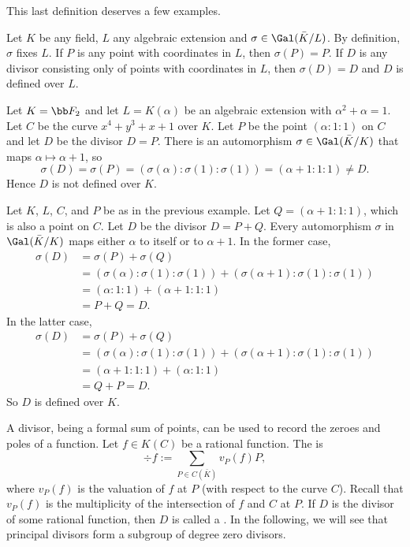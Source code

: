 This last definition deserves a few examples.
\begin{example}
  Let $K$ be any field, $L$ any algebraic extension and $\sigma \in \Gal(\bar K/L)$.
  By definition, $\sigma$ fixes $L$.
  If $P$ is any point with coordinates in $L$, then $\sigma(P) = P$.
  If $D$ is any divisor consisting only of points with coordinates in $L$, then $\sigma(D) = D$ and $D$ is defined over $L$.
\end{example}
\begin{example}
  Let $K = \bb F_2$ and let $L = K(\alpha)$ be an algebraic extension with $\alpha^2 + \alpha = 1$.
  Let $C$ be the curve $x^4 + y^3 + x + 1$ over $K$.
  Let $P$ be the point $(\alpha : 1 : 1)$ on $C$ and let $D$ be the divisor $D = P$.
  There is an automorphism $\sigma \in \Gal(\bar K/K)$ that maps $\alpha \mapsto \alpha + 1$, so 
    \[ \sigma(D) = \sigma(P) = (\sigma(\alpha) : \sigma(1) : \sigma(1)) = (\alpha + 1 : 1 : 1) \neq D. \]
  Hence $D$ is not defined over $K$.
\end{example}
\begin{example}
  Let $K$, $L$, $C$, and $P$ be as in the previous example.
  Let $Q = (\alpha + 1 : 1 : 1)$, which is also a point on $C$.
  Let $D$ be the divisor $D = P + Q$.
  Every automorphism $\sigma$ in $\Gal(\bar K/K)$ maps either $\alpha$ to itself or to $\alpha + 1$.
  In the former case,
  \begin{align*}
    \sigma(D) &= \sigma(P) + \sigma(Q) \\
              &= (\sigma(\alpha) : \sigma(1) : \sigma(1)) + (\sigma(\alpha + 1) : \sigma(1) : \sigma(1)) \\
              &= (\alpha : 1 : 1) + (\alpha + 1 : 1 : 1) \\
              &= P + Q = D.
  \end{align*}
  In the latter case,
  \begin{align*}
    \sigma(D) &= \sigma(P) + \sigma(Q) \\
              &= (\sigma(\alpha) : \sigma(1) : \sigma(1)) + (\sigma(\alpha + 1) : \sigma(1) : \sigma(1)) \\
              &= (\alpha + 1 : 1 : 1) + (\alpha : 1 : 1) \\
              &= Q + P = D.
  \end{align*}
  So $D$ is defined over $K$.
\end{example}

A divisor, being a formal sum of points, can be used to record the zeroes and poles of a function.
Let $f \in K(C)$ be a rational function.
The  is
  \[ \div f := \sum_{P \in C(\bar K)} v_P(f)P, \]
where $v_P(f)$ is the valuation of $f$ at $P$ (with respect to the curve $C$).
Recall  that $v_P(f)$ is the multiplicity of the intersection of $f$ and $C$ at $P$.
If $D$ is the divisor of some rational function, then $D$ is called a .
In the following, we will see that principal divisors form a subgroup of degree zero divisors.

